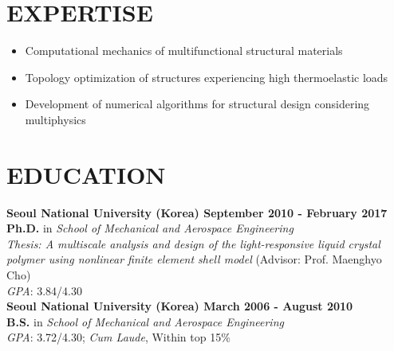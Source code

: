 \documentclass[margin, 10pt]{res} %
\begin{document}
\begin{resume}

 
\section{EXPERTISE}  
\begin{itemize}
    \item Computational mechanics of multifunctional structural materials 
    \item Topology optimization of structures experiencing high thermoelastic loads
    \item Development of numerical algorithms for structural design considering \\ multiphysics 
\end{itemize}
    
\section{EDUCATION}

\textbf{Seoul National University (Korea) \hfill September 2010 - February 2017} \\
\textbf{Ph.D.} in \textit{School of Mechanical and Aerospace Engineering} \\ 
\textit{Thesis: A multiscale analysis and design of the light-responsive liquid crystal polymer using nonlinear finite element shell model} (Advisor: Prof. Maenghyo Cho)\\ 
\textit{GPA}: 3.84/4.30 \\

\textbf{Seoul National University (Korea) \hfill March 2006 - August 2010} \\
\textbf{B.S.} in \textit{School of Mechanical and Aerospace Engineering} \\
\textit{GPA}: 3.72/4.30; \textit{Cum Laude}, Within top 15\% \\


\end{resume}
\end{document}
